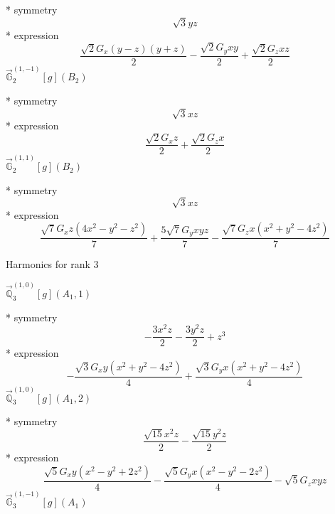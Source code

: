 \documentclass[fleqn,8pt]{jsarticle}
\begin{document}
\noindent\quad ** symmetry
\begin{dmath*}
\sqrt{3} y z
\end{dmath*}
\noindent\quad ** expression
\begin{dmath*}
\frac{\sqrt{2} G_{x} \left(y - z\right) \left(y + z\right)}{2} - \frac{\sqrt{2} G_{y} x y}{2} + \frac{\sqrt{2} G_{z} x z}{2}
\end{dmath*}
\noindent\quad $\vec{\mathbb{G}}_{2}^{(1,-1)}[g](B_{2})$

\noindent\quad ** symmetry
\begin{dmath*}
\sqrt{3} x z
\end{dmath*}
\noindent\quad ** expression
\begin{dmath*}
\frac{\sqrt{2} G_{x} z}{2} + \frac{\sqrt{2} G_{z} x}{2}
\end{dmath*}
\noindent\quad $\vec{\mathbb{G}}_{2}^{(1,1)}[g](B_{2})$

\noindent\quad ** symmetry
\begin{dmath*}
\sqrt{3} x z
\end{dmath*}
\noindent\quad ** expression
\begin{dmath*}
\frac{\sqrt{7} G_{x} z \left(4 x^{2} - y^{2} - z^{2}\right)}{7} + \frac{5 \sqrt{7} G_{y} x y z}{7} - \frac{\sqrt{7} G_{z} x \left(x^{2} + y^{2} - 4 z^{2}\right)}{7}
\end{dmath*}

\noindent * Harmonics for rank 3

\noindent\quad $\vec{\mathbb{Q}}_{3}^{(1,0)}[g](A_{1},1)$

\noindent\quad ** symmetry
\begin{dmath*}
- \frac{3 x^{2} z}{2} - \frac{3 y^{2} z}{2} + z^{3}
\end{dmath*}
\noindent\quad ** expression
\begin{dmath*}
- \frac{\sqrt{3} G_{x} y \left(x^{2} + y^{2} - 4 z^{2}\right)}{4} + \frac{\sqrt{3} G_{y} x \left(x^{2} + y^{2} - 4 z^{2}\right)}{4}
\end{dmath*}
\noindent\quad $\vec{\mathbb{Q}}_{3}^{(1,0)}[g](A_{1},2)$

\noindent\quad ** symmetry
\begin{dmath*}
\frac{\sqrt{15} x^{2} z}{2} - \frac{\sqrt{15} y^{2} z}{2}
\end{dmath*}
\noindent\quad ** expression
\begin{dmath*}
\frac{\sqrt{5} G_{x} y \left(x^{2} - y^{2} + 2 z^{2}\right)}{4} - \frac{\sqrt{5} G_{y} x \left(x^{2} - y^{2} - 2 z^{2}\right)}{4} - \sqrt{5} G_{z} x y z
\end{dmath*}
\noindent\quad $\vec{\mathbb{G}}_{3}^{(1,-1)}[g](A_{1})$
\end{document}
